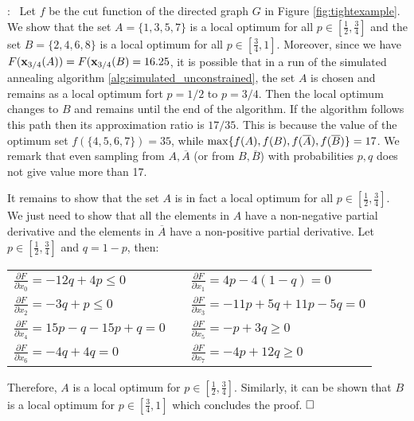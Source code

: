 \documentclass{article}[11pt]
\newcommand{\partdiff}[2]{\frac{\partial {#1}}{\partial {#2}}}
\renewenvironment{proof}{\noindent{\bf Proof}:~}{$\hfill \Box$\\}
\def\bx{{\bf x}}
\def\max{{\rm{max}}}
\begin{document}
\begin{proof}
Let $f$ be the cut function of the directed graph $G$ in Figure \ref{fig:tightexample}.
We show that the set $A=\{1,3,5,7\}$ is a local optimum for all $p\in [\frac{1}{2},
\frac{3}{4}]$ and the set $B=\{2,4,6,8\}$ is a local optimum for all $p\in [\frac{3}{4},1]$.
Moreover, since we have $F(\bx_{3/4}(A)) = F(\bx_{3/4}(B)=16.25$, it is possible
that in a run of the simulated annealing algorithm \ref{alg:simulated_unconstrained},
the set $A$ is chosen and remains as a local optimum fort $p=1/2$ to $p=3/4$.
Then the local optimum changes to $B$ and remains until the end of the algorithm. 
If the algorithm follows this path then its approximation ratio
is $17/35$. This is because the value of the optimum set
$f(\{4,5,6,7\})=35$, while $\max\{f(A),f(B),f(\overline{A}),f(\overline{B})\} = 17$.
We remark that even sampling from $A,\overline{A}$ (or from $B,\overline{B}$)
with probabilities $p,q$ does not give value more than 17.

It remains to show that the set $A$ is in fact a local optimum for all
$p\in[\frac{1}{2},\frac{3}{4}]$. We just need to show that all the elements
in $A$ have a  non-negative partial derivative and the elements in $\overline{A}$
have a non-positive partial derivative. Let $p\in[\frac{1}{2}, \frac{3}{4}]$
and $q=1-p$, then:

\begin{center}
\begin{tabular}{lcl}
$\partdiff{F}{x_0} = -12q+4p \leq 0$ & & $\partdiff{F}{x_1} =  4p  - 4(1-q) = 0$ \\
$\partdiff{F}{x_2} =  -3q +p \leq 0$ & & $\partdiff{F}{x_3} = -11p+5q+11p-5q=0$\\
 $\partdiff{F}{x_4} =  15p-q-15p+q = 0$ & & $\partdiff{F}{x_5} = -p+3q \geq 0$ \\
  $\partdiff{F}{x_6} =  -4q + 4q = 0$ & & $\partdiff{F}{x_7} = -4p+12q\geq 0$ 
\end{tabular}
\end{center}

Therefore, $A$ is a local optimum for $p\in[\frac12,\frac34]$.
Similarly, it can be shown that $B$ is a local optimum for $p\in[\frac{3}{4},1]$
which concludes the proof.
\end{proof}
\end{document}
